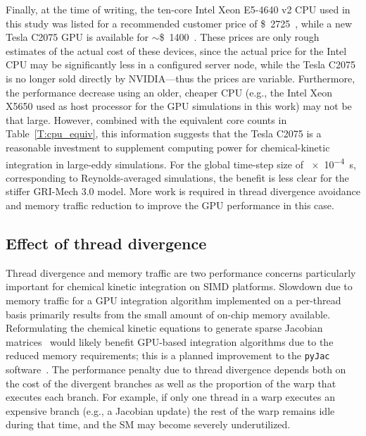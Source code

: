 \documentclass[preprint,review,11pt]{elsarticle}
\begin{document}
Finally, at the time of writing, the ten-core Intel Xeon E5-4640 v2 CPU used in this study was listed for a recommended customer price of \SI{2725}[\$]{}~\cite{intel_price}, while a new Tesla C2075 GPU is available for $\sim$\SI{1400}[\$]{}~\cite{gpu_price}.
These prices are only rough estimates of the actual cost of these devices, since the actual price for the Intel CPU may be significantly less in a configured server node, while the Tesla C2075 is no longer sold directly by NVIDIA---thus the prices are variable.
Furthermore, the performance decrease using an older, cheaper CPU (e.g., the Intel Xeon X5650 used as host processor for the GPU simulations in this work) may not be that large.
However, combined with the equivalent core counts in Table~\ref{T:cpu_equiv}, this information suggests that the Tesla C2075 is a reasonable investment to supplement computing power for chemical-kinetic integration in large-eddy simulations.
For the global time-step size of \SI{e-4}{\second}, corresponding to Reynolds-averaged simulations, the benefit is less clear for the stiffer GRI-Mech 3.0 model.
More work is required in thread divergence avoidance and memory traffic reduction to improve the GPU performance in this case.


\subsection{Effect of thread divergence}
\label{S:divergence}

Thread divergence and memory traffic are two performance concerns particularly important for chemical kinetic integration on SIMD platforms.
Slowdown due to memory traffic for a GPU integration algorithm implemented on a per-thread basis primarily results from the small amount of on-chip memory available.
Reformulating the chemical kinetic equations to generate sparse Jacobian matrices~\cite{Schwer2002270} would likely benefit GPU-based integration algorithms due to the reduced memory requirements; this is a planned improvement to the \texttt{pyJac} software~\cite{Niemeyer:2016aa,niemeyer_2016_51139}.
The performance penalty due to thread divergence depends both on the cost of the divergent branches as well as the proportion of the warp that executes each branch.
For example, if only one thread in a warp executes an expensive branch (e.g., a Jacobian update) the rest of the warp remains idle during that time, and the SM may become severely underutilized.
\end{document}
